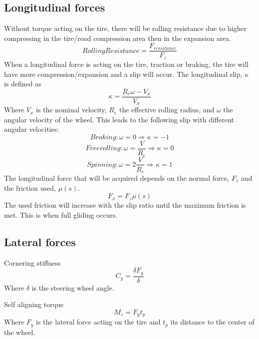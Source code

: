 \subsection{Longitudinal forces}

Without torque acting on the tire, there will be rolling resistance due to higher compressing in the tire/road compression area then in the expansion area.
\begin{equation}
RollingResistance = \frac{F_{resistance}}{F_{z}}
\end{equation}
When a longitudinal force is acting on the tire, traction or braking, the tire will have more compression/expansion and a slip will occur. The longitudinal slip, $ \kappa $ is defined as
\begin{equation}
\kappa = \dfrac{R_{e}\omega-V_{x}}{V_{x}}
\end{equation}
Where $V_{x}$ is the nominal velocity, $R_{e}$ the effective rolling radius, and $\omega$ the angular velocity of the wheel. This leads to the following slip with different angular velocities:
\begin{equation}
Braking: \omega = 0 \Rightarrow \kappa = -1
\end{equation}
\begin{equation}
Free rolling: \omega = \frac{V}{R_{e}} \Rightarrow \kappa = 0
\end{equation}
\begin{equation}
Spinning: \omega = 2\frac{V}{R_{e}} \Rightarrow \kappa = 1
\end{equation}
The longitudinal force that will be acquired depends on the normal force, $ F_{z} $ and the friction used, $ \mu(s) $.
\begin{equation}
F_{x} = F_{z}\mu(s)
\end{equation}
The used friction will increase with the slip ratio until the maximum friction is met. This is when full gliding occurs. 

\subsection{Lateral forces}

Cornering stiffness
\begin{equation}
C_{y} = \frac{\delta F_{y}}{\delta}
\end{equation}
Where $\delta$ is the steering wheel angle.

Self aligning torque
\begin{equation}
M_{z} = F_{y}t_{p}
\end{equation}
Where $ F_{y} $  is the lateral force acting on the tire and $ t_{p} $ its distance to the center of the wheel. 

